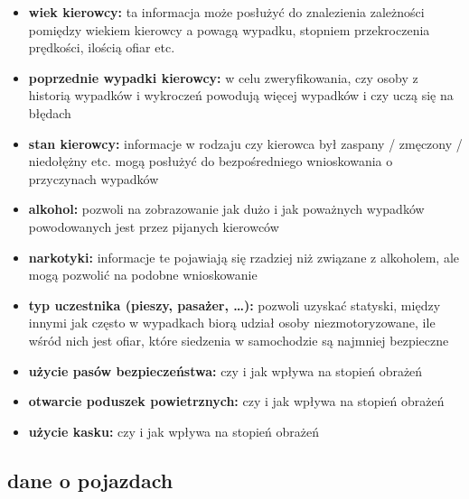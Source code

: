 \begin{itemize}
\itemsep-14pt\parskip0pt
\item
  \textbf{wiek kierowcy:} ta informacja może posłużyć do znalezienia
  zależności pomiędzy wiekiem kierowcy a powagą wypadku, stopniem
  przekroczenia prędkości, ilością ofiar etc.\\
\item
  \textbf{poprzednie wypadki kierowcy:} w celu zweryfikowania, czy osoby
  z historią wypadków i wykroczeń powodują więcej wypadków i czy uczą
  się na błędach\\
\item
  \textbf{stan kierowcy:} informacje w rodzaju czy kierowca był zaspany
  / zmęczony / niedołężny etc. mogą posłużyć do bezpośredniego
  wnioskowania o przyczynach wypadków\\
\item
  \textbf{alkohol:} pozwoli na zobrazowanie jak dużo i jak poważnych
  wypadków powodowanych jest przez pijanych kierowców\\
\item
  \textbf{narkotyki:} informacje te pojawiają się rzadziej niż związane
  z alkoholem, ale mogą pozwolić na podobne wnioskowanie\\
\item
  \textbf{typ uczestnika (pieszy, pasażer, \ldots{}):} pozwoli uzyskać
  statyski, między innymi jak często w wypadkach biorą udział osoby
  niezmotoryzowane, ile wśród nich jest ofiar, które siedzenia w
  samochodzie są najmniej bezpieczne\\
\item
  \textbf{użycie pasów bezpieczeństwa:} czy i jak wpływa na stopień
  obrażeń\\
\item
  \textbf{otwarcie poduszek powietrznych:} czy i jak wpływa na stopień
  obrażeń\\
\item
  \textbf{użycie kasku:} czy i jak wpływa na stopień obrażeń
\end{itemize}

\subsection{dane o pojazdach}\label{dane-o-pojazdach}

